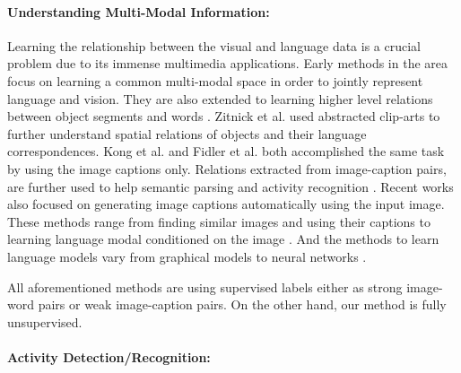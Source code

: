 \paragraph{Understanding Multi-Modal Information:}
Learning the relationship between the visual and language data is a crucial problem due to its immense multimedia applications. Early methods \cite{matching} in the area focus on learning a common multi-modal space in order to jointly represent language and vision. They are also extended to learning higher level relations between object segments and words \cite{connecting}. Zitnick et al.\cite{zitnick2013learning,zitnick2013bringing} used abstracted clip-arts to further understand spatial relations of objects and their language correspondences. Kong et al. \cite{kong2014you} and Fidler et al. \cite{fidler2013sentence} both accomplished the same task by using the image captions only. Relations extracted from image-caption pairs, are further used to help semantic parsing \cite{yu2013grounded} and activity recognition \cite{motwani2012improving}. Recent works also focused on generating image captions automatically using the input image. These methods range from finding similar images and using their captions \cite{ordonez2011im2text} to learning language modal conditioned on the image \cite{kiros2014multimodal,socher2014grounded,farhadi2010every}. And the methods to learn language models vary from graphical models \cite{farhadi2010every} to neural networks \cite{socher2014grounded,kiros2014multimodal,deepAlignment}.

All aforementioned methods are using supervised labels either as strong image-word pairs or weak image-caption pairs. On the other hand, our method is fully unsupervised.

\paragraph{Activity Detection/Recognition:}


